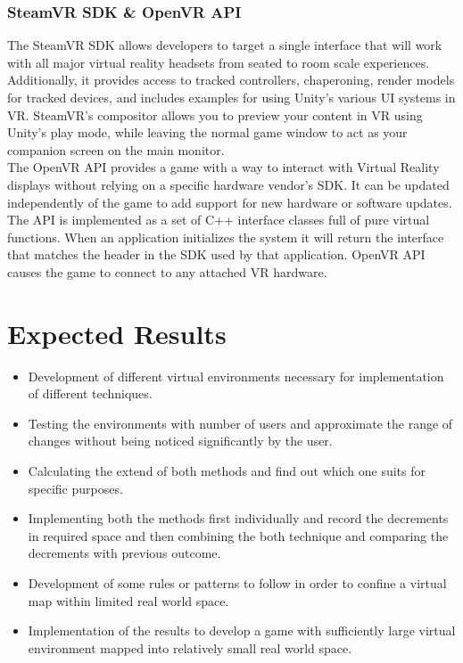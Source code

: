 \documentclass[12pt]{article}
\begin{document}
\subsubsection{SteamVR SDK \& OpenVR API}
The SteamVR SDK allows developers to target a single interface that will work with all major virtual reality headsets from seated to room scale experiences. Additionally, it provides access to tracked controllers, chaperoning, render models for tracked devices, and includes examples for using Unity's various UI systems in VR. SteamVR's compositor allows you to preview your content in VR using Unity's play mode, while leaving the normal game window to act as your companion screen on the main monitor.
\\ The OpenVR API provides a game with a way to interact with Virtual Reality displays without relying on a specific hardware vendor's SDK. It can be updated independently of the game to add support for new hardware or software updates. The API is implemented as a set of C++ interface classes full of pure virtual functions. When an application initializes the system it will return the interface that matches the header in the SDK used by that application. OpenVR API causes the game to connect to any attached VR hardware.
\\ 


\clearpage

\section{Expected Results}
\begin{itemize}
\item Development of different virtual environments necessary for implementation of different techniques.
\item Testing the environments with number of users and approximate the range of changes without being noticed significantly by the user.
\item Calculating the extend of both methods and find out which one suits for specific purposes.
\item Implementing both the methods first individually and record the decrements in required space and then combining the both technique and comparing the decrements with previous outcome.
\item Development of  some rules or patterns to follow in order to confine a virtual map within limited real world space.
\item Implementation of the results to develop a game with sufficiently large virtual environment mapped into relatively small real world space.
\end{itemize}
\end{document}
